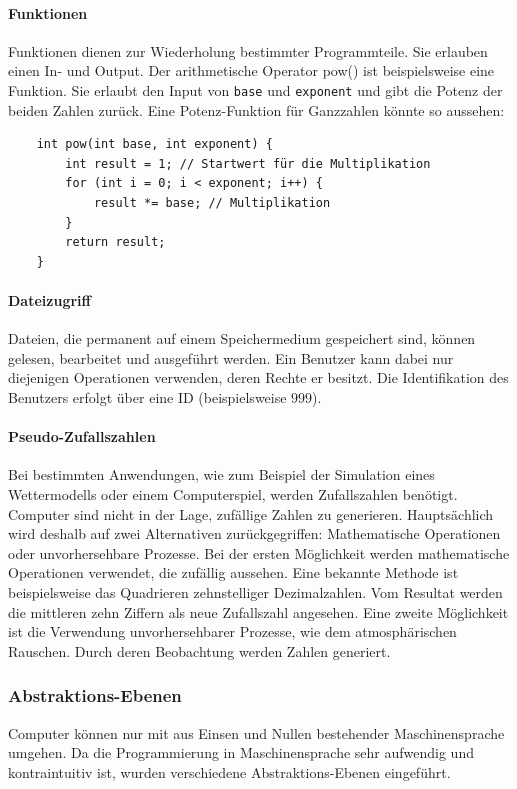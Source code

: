 \documentclass[11pt, a4paper]{article}
\begin{document}
\paragraph{Funktionen}
Funktionen dienen zur Wiederholung bestimmter Programmteile. Sie erlauben einen In- und Output. Der arithmetische Operator pow() ist beispielsweise eine Funktion. Sie erlaubt den Input von \texttt{base} und \texttt{exponent} und gibt die Potenz der beiden Zahlen zurück. Eine Potenz-Funktion für Ganzzahlen könnte so aussehen:
\begin{lstlisting}
	int pow(int base, int exponent) {
		int result = 1; // Startwert für die Multiplikation
		for (int i = 0; i < exponent; i++) {
			result *= base; // Multiplikation
		}
		return result;
	}
\end{lstlisting}

\paragraph{Dateizugriff}
Dateien, die permanent auf einem Speichermedium gespeichert sind, können gelesen, bearbeitet und ausgeführt werden. Ein Benutzer kann dabei nur diejenigen Operationen verwenden, deren Rechte er besitzt. Die Identifikation des Benutzers erfolgt über eine ID (beispielsweise \(999\)).

\paragraph{Pseudo-Zufallszahlen}
Bei bestimmten Anwendungen, wie zum Beispiel der Simulation eines Wettermodells oder einem Computerspiel, werden Zufallszahlen benötigt. Computer sind nicht in der Lage, zufällige Zahlen zu generieren. Hauptsächlich wird deshalb auf zwei Alternativen zurückgegriffen: Mathematische Operationen oder unvorhersehbare Prozesse. Bei der ersten Möglichkeit werden mathematische Operationen verwendet, die zufällig aussehen. Eine bekannte Methode ist beispielsweise das Quadrieren zehnstelliger Dezimalzahlen. Vom Resultat werden die mittleren zehn Ziffern als neue Zufallszahl angesehen. Eine zweite Möglichkeit ist die Verwendung unvorhersehbarer Prozesse, wie dem atmosphärischen Rauschen. Durch deren Beobachtung werden Zahlen generiert.~\cite{Mathemat11:online}

\subsubsection{Abstraktions-Ebenen}
Computer können nur mit aus Einsen und Nullen bestehender Maschinensprache umgehen. Da die Programmierung in Maschinensprache sehr aufwendig und kontraintuitiv ist, wurden verschiedene Abstraktions-Ebenen eingeführt.
\end{document}
